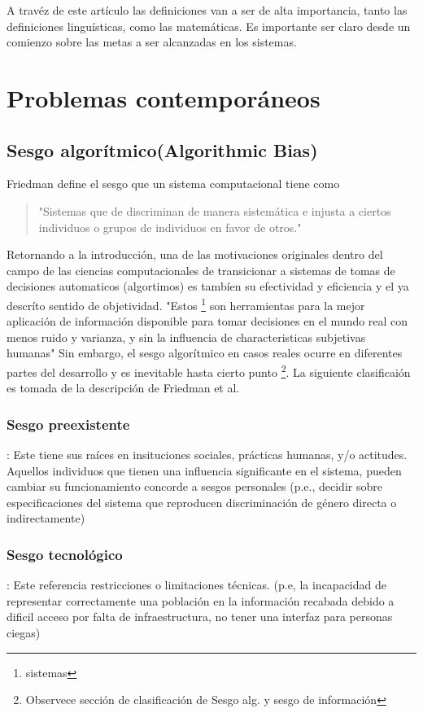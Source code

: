 A travéz de este artículo las definiciones van a ser de alta importancia, tanto las definiciones linguísticas, como las matemáticas. Es importante ser claro desde un comienzo sobre las metas a ser alcanzadas en los sistemas.

\section{Problemas contemporáneos}

\subsection{Sesgo algorítmico(Algorithmic Bias)}
\label{AlgorithmicBias}

Friedman define el sesgo que un sistema computacional tiene como \begin{quote}
  "Sistemas que de discriminan de manera sistemática e injusta a ciertos individuos o grupos de individuos en favor de otros."\cite{Compsysbias}
\end{quote}
Retornando a la introducción, una de las motivaciones originales dentro del campo de las ciencias computacionales de transicionar a sistemas de tomas de decisiones automaticos (algortimos) es tambíen su efectividad y eficiencia y el ya descríto sentido de objetividad. "Estos \footnote{sistemas} son herramientas para la mejor aplicación de información disponible para tomar decisiones en el mundo real con menos ruido y varianza, y sin la influencia de characteristicas subjetivas humanas" \cite{OBS*19} Sin embargo, el sesgo algorítmico en casos reales ocurre en diferentes partes del desarrollo y es inevitable hasta cierto punto \footnote{Observece sección de clasificación de Sesgo alg. y sesgo de información}.
La siguiente clasificaión es tomada de la descripción de Friedman et al. \cite{Compsysbias}


\subsubsection{Sesgo preexistente}: \label{PreexsitingBias}
Este tiene sus raíces en insituciones sociales, prácticas humanas, y/o actitudes\cite{Compsysbias}.
Aquellos individuos que tienen una influencia significante en el sistema, pueden cambiar su funcionamiento concorde a sesgos personales (p.e., decidir sobre especificaciones del sistema que reproducen discriminación de género directa o indirectamente)
\subsubsection{Sesgo tecnológico}: \label{TechnicalBias}
Este referencia restricciones o limitaciones técnicas. (p.e, la incapacidad de representar correctamente una población en la información recabada debido a dificil acceso por falta de infraestructura, no tener una interfaz para personas ciegas)
